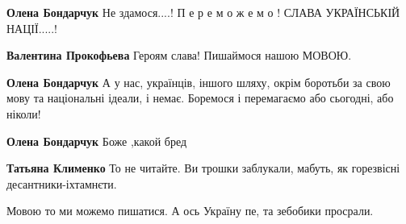 \begin{itemize}
\begin{itemize}
\textbf{Олена Бондарчук}
Не здамося....!
П е р е м о ж е м о !
СЛАВА УКРАЇНСЬКІЙ
НАЦІЇ.....!

\begin{itemize}
 
\textbf{Валентина Прокофьева} Героям слава! Пишаймося нашою МОВОЮ.
\end{itemize}

 
\textbf{Олена Бондарчук} А у нас, українців, іншого шляху, окрім боротьби за свою мову та національні ідеали, і немає. Боремося і перемагаємо або сьогодні, або ніколи!

 
\textbf{Олена Бондарчук} Боже ,какой бред

\begin{itemize}
 
\textbf{Татьяна Клименко} То не читайте. Ви трошки заблукали, мабуть, як горезвісні десантники-іхтамнєти.
\end{itemize}

 
Мовою то ми можемо пишатися.
А ось Україну пе, та зебобики просрали.

\begin{itemize}
 

\end{itemize}
\end{itemize}
\end{itemize}
